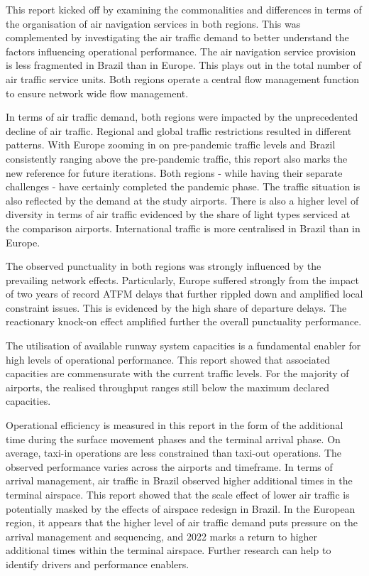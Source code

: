 \documentclass[
  a4paper,
  DIV=11,
  numbers=noendperiod]{scrreport}
\begin{document}
This report kicked off by examining the commonalities and differences in
terms of the organisation of air navigation services in both regions.
This was complemented by investigating the air traffic demand to better
understand the factors influencing operational performance. The air
navigation service provision is less fragmented in Brazil than in
Europe. This plays out in the total number of air traffic service units.
Both regions operate a central flow management function to ensure
network wide flow management.

In terms of air traffic demand, both regions were impacted by the
unprecedented decline of air traffic. Regional and global traffic
restrictions resulted in different patterns. With Europe zooming in on
pre-pandemic traffic levels and Brazil consistently ranging above the
pre-pandemic traffic, this report also marks the new reference for
future iterations. Both regions - while having their separate challenges
- have certainly completed the pandemic phase. The traffic situation is
also reflected by the demand at the study airports. There is also a
higher level of diversity in terms of air traffic evidenced by the share
of light types serviced at the comparison airports. International
traffic is more centralised in Brazil than in Europe.

The observed punctuality in both regions was strongly influenced by the
prevailing network effects. Particularly, Europe suffered strongly from
the impact of two years of record ATFM delays that further rippled down
and amplified local constraint issues. This is evidenced by the high
share of departure delays. The reactionary knock-on effect amplified
further the overall punctuality performance.

The utilisation of available runway system capacities is a fundamental
enabler for high levels of operational performance. This report showed
that associated capacities are commensurate with the current traffic
levels. For the majority of airports, the realised throughput ranges
still below the maximum declared capacities.

Operational efficiency is measured in this report in the form of the
additional time during the surface movement phases and the terminal
arrival phase. On average, taxi-in operations are less constrained than
taxi-out operations. The observed performance varies across the airports
and timeframe. In terms of arrival management, air traffic in Brazil
observed higher additional times in the terminal airspace. This report
showed that the scale effect of lower air traffic is potentially masked
by the effects of airspace redesign in Brazil. In the European region,
it appears that the higher level of air traffic demand puts pressure on
the arrival management and sequencing, and 2022 marks a return to higher
additional times within the terminal airspace. Further research can help
to identify drivers and performance enablers.
\end{document}
